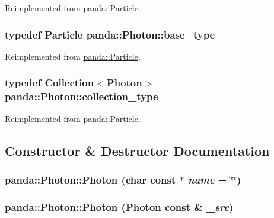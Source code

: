 Reimplemented from \hyperlink{classpanda_1_1Particle_ac7774202a46a6e99815ebbda009cdeff}{panda::Particle}.\hypertarget{classpanda_1_1Photon_a462a23e58af84e7c0eec1442206ccf04}{
\subsubsection[{base\_\-type}]{\setlength{\rightskip}{0pt plus 5cm}typedef {\bf Particle} {\bf panda::Photon::base\_\-type}}}
\label{classpanda_1_1Photon_a462a23e58af84e7c0eec1442206ccf04}


Reimplemented from \hyperlink{classpanda_1_1Particle_a0055c0e7a7015a0446f6c4f8e6f1d469}{panda::Particle}.\hypertarget{classpanda_1_1Photon_a76c4cc6e762c1d6785586b7546d2573f}{
\subsubsection[{collection\_\-type}]{\setlength{\rightskip}{0pt plus 5cm}typedef {\bf Collection}$<${\bf Photon}$>$ {\bf panda::Photon::collection\_\-type}}}
\label{classpanda_1_1Photon_a76c4cc6e762c1d6785586b7546d2573f}


Reimplemented from \hyperlink{classpanda_1_1Particle_a5c7d779f6db770bcc94cfe63c42b59d2}{panda::Particle}.

\subsection{Constructor \& Destructor Documentation}
\hypertarget{classpanda_1_1Photon_a4a65a603af7ae878ce7a47f37aa61ae1}{
\subsubsection[{Photon}]{\setlength{\rightskip}{0pt plus 5cm}panda::Photon::Photon (char const $\ast$ {\em name} = {\ttfamily \char`\"{}\char`\"{}})}}
\label{classpanda_1_1Photon_a4a65a603af7ae878ce7a47f37aa61ae1}
\hypertarget{classpanda_1_1Photon_a24cd4cce4540ae2b4fe271e870e098ee}{
\subsubsection[{Photon}]{\setlength{\rightskip}{0pt plus 5cm}panda::Photon::Photon ({\bf Photon} const \& {\em \_\-src})}}
\label{classpanda_1_1Photon_a24cd4cce4540ae2b4fe271e870e098ee}


